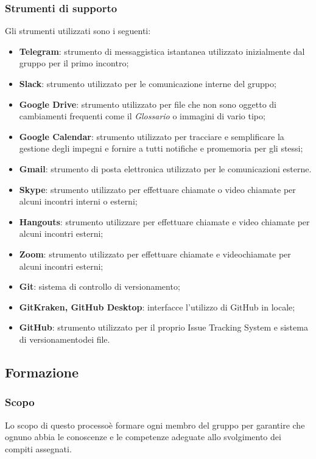 		\subsubsection{Strumenti di supporto}
			Gli strumenti utilizzati sono i seguenti:
			\begin{itemize}
				\item \textbf{Telegram}: strumento di messaggistica istantanea utilizzato inizialmente dal gruppo per il primo incontro;
				\item \textbf{Slack}: strumento utilizzato per le comunicazione interne del gruppo;
				\item \textbf{Google Drive}: strumento utilizzato per file che non sono oggetto di cambiamenti frequenti come il \textit{Glossario} o immagini di vario tipo;
				\item \textbf{Google Calendar}: strumento utilizzato per tracciare e semplificare la gestione degli impegni e fornire a tutti notifiche e promemoria per gli stessi;
				\item \textbf{Gmail}: strumento di posta elettronica utilizzato per le comunicazioni esterne.
				\item \textbf{Skype}: strumento utilizzato per effettuare chiamate o video chiamate per alcuni incontri interni o esterni;
				\item \textbf{Hangouts}: strumento utilizzare per effettuare chiamate e video chiamate per alcuni incontri esterni;
				\item \textbf{Zoom}: strumento utilizzato per effettuare chiamate e videochiamate per alcuni incontri esterni; 
				\item \textbf{Git}: sistema di controllo di versionamento\glo;
				\item \textbf{GitKraken, GitHub Desktop}: interfacce l'utilizzo di GitHub in locale;
				\item \textbf{GitHub}: strumento utilizzato per il proprio Issue Tracking System e sistema di versionamento\glosp dei file.
			\end{itemize}
	\subsection{Formazione}
		\subsubsection{Scopo}
			Lo scopo di questo processo\glosp è formare ogni membro del gruppo per garantire che ognuno abbia le conoscenze e le competenze adeguate allo svolgimento dei compiti assegnati.
